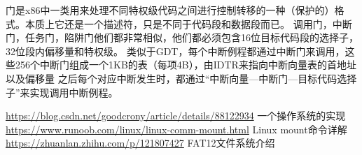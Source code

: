 \documentclass[12pt,a4paper,UTF8]{ctexart}
\begin{document}
门是x86中一类用来处理不同特权级代码之间进行控制转移的一种（保护的）格式。本质上它还是一个描述符，只是不同于代码段和数据段而已。
调用门，中断门，任务门，陷阱门他们都非常相似，他们都必须包含16位目标代码段的选择子，32位段内偏移量和特权级。
类似于GDT，每个中断例程都通过中断门来调用，这些256个中断门组成一个1KB的表（每项4B），由IDTR来指向中断向量表的首地址以及偏移量
之后每个对应中断发生时，都通过“中断向量---中断门---目标代码选择子”来实现调用中断例程。

\begin{thebibliography}{1}
 \href{https://blog.csdn.net/goodcrony/article/details/88122934}
{https://blog.csdn.net/goodcrony/article/details/88122934}
一个操作系统的实现
 \href{https://www.runoob.com/linux/linux-comm-mount.html}
{https://www.runoob.com/linux/linux-comm-mount.html}
Linux mount命令详解
 \href{https://zhuanlan.zhihu.com/p/121807427}
{https://zhuanlan.zhihu.com/p/121807427}
FAT12文件系统介绍
\end{thebibliography}
\end{document}
